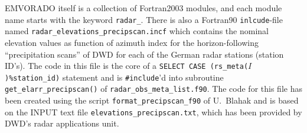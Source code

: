 \documentclass[10pt,a4paper,twoside,headinclude,footinclude,parskip=half]{scrartcl}
\newcommand{\myaktuellesection}{sec:intro}%
\newcommand{\labelsec}[1]{\label{#1}\renewcommand{\myaktuellesection}{#1}}%
\newcommand{\labelsec}[1]{\label{#1}}%
\newcommand{\srcform}[1]{\mbox{\texttt{#1}}\xspace}%
\begin{document}
\labelsec{sec:impl}

EMVORADO itself is a collection of Fortran2003 modules, and each module name starts with the keyword \srcform{radar_}.
There is also a Fortran90  \srcform{inlcude}-file named \srcform{radar_elevations_precipscan.incf} which contains
the nominal elevation values as function of azimuth index for the horizon-following ``precipitation scans'' of DWD for
each of the German radar stations (station ID's).
The code in this file is the core of a \mbox{\srcform{SELECT CASE (rs_meta($I$)\%station_id)}} statement and
is \srcform{\#include}'d into subroutine \srcform{get_elarr_precipscan()} of \srcform{radar_obs_meta_list.f90}.
The code for this file has been created using the script \srcform{format_precipscan_f90} of U.~Blahak and
is based on the INPUT text file \srcform{elevations_precipscan.txt}, which has been provided by DWD's radar applications unit.
\end{document}
